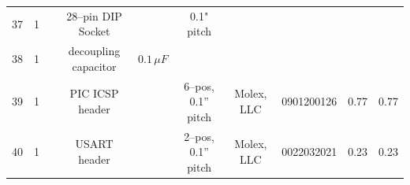 \documentclass[10pt, twocolumn]{article}
\begin{document}
\begin{center}
\begin{adjustbox}{max width=\textwidth}
\begin{tabular}{c c c c c c c c c c}
37	&1	&	&28--pin DIP Socket		&					&0.1" pitch
	&		&				&		&	\\

38	&1	&	&decoupling capacitor		&$0.1\,\mu F$				&
	&		&				&		&	\\

39	&1	&	&PIC ICSP header		&				&6--pos, 0.1” pitch
	&Molex, LLC	&0901200126			&0.77		&0.77	\\

40	&1	&	&USART header			&				&2--pos, 0.1” pitch
	&Molex, LLC	&0022032021			&0.23		&0.23	\\

\hline\hline
\end{tabular}
\end{adjustbox}
\label{digikey-bill-of-materials}
\end{center}
\end{document}
